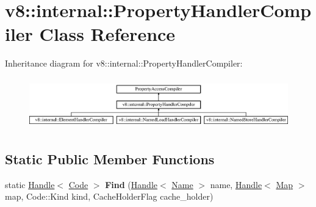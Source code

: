 \hypertarget{classv8_1_1internal_1_1_property_handler_compiler}{}\section{v8\+:\+:internal\+:\+:Property\+Handler\+Compiler Class Reference}
\label{classv8_1_1internal_1_1_property_handler_compiler}
Inheritance diagram for v8\+:\+:internal\+:\+:Property\+Handler\+Compiler\+:\begin{figure}[H]
\begin{center}
\leavevmode
\includegraphics[height=2.222222cm]{classv8_1_1internal_1_1_property_handler_compiler}
\end{center}
\end{figure}
\subsection*{Static Public Member Functions}
\begin{DoxyCompactItemize}
\item 
static \hyperlink{classv8_1_1internal_1_1_handle}{Handle}$<$ \hyperlink{classv8_1_1internal_1_1_code}{Code} $>$ {\bfseries Find} (\hyperlink{classv8_1_1internal_1_1_handle}{Handle}$<$ \hyperlink{classv8_1_1internal_1_1_name}{Name} $>$ name, \hyperlink{classv8_1_1internal_1_1_handle}{Handle}$<$ \hyperlink{classv8_1_1internal_1_1_map}{Map} $>$ map, Code\+::\+Kind kind, Cache\+Holder\+Flag cache\+\_\+holder)\hypertarget{classv8_1_1internal_1_1_property_handler_compiler_a7c6a5a77ee699dae32438698f405b78b}{}\label{classv8_1_1internal_1_1_property_handler_compiler_a7c6a5a77ee699dae32438698f405b78b}

\end{DoxyCompactItemize}
